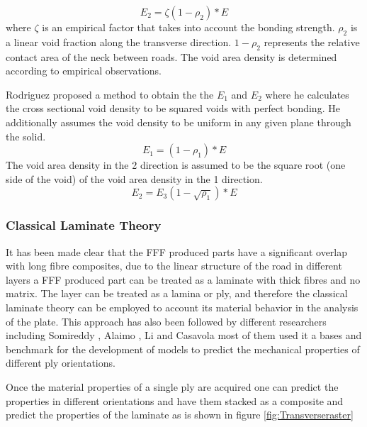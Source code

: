 \begin{equation} \label{eqn:ROMseriesfactor}
E_2=\zeta(1-\rho_2)*E
\end{equation}
where $\zeta$ is an empirical factor that takes into account the bonding strength. $\rho_2$ is a linear void fraction along the transverse direction. $1-\rho_2$  represents the relative contact area of the neck between roads. The void area density is determined according to empirical observations. 

Rodriguez \cite{Rodriguez2003MechanicalModeling} proposed a method to obtain the the $E_1$ and $E_2$ where he calculates the cross sectional void density to be squared voids with perfect bonding. He additionally assumes the void density to be uniform in any given plane through the solid. 
\begin{equation}\label{eqn:E_1}
E_1=(1-\rho_1)*E
\end{equation}The void area density in the 2 direction is assumed to be the square root (one side of the void) of the void area density in the 1 direction.
\begin{equation}\label{eqn:E_2}
E_2=E_3(1-\sqrt{\rho_1})*E
\end{equation}
\subsubsection{Classical Laminate Theory}
It has been made clear that the FFF produced parts have a significant overlap with long fibre composites, due to the linear structure of the road in different layers a FFF produced part can be treated as a laminate with thick fibres and no matrix. The layer can be treated as a lamina or ply, and therefore the classical laminate theory can be employed to account its material behavior in the analysis of the plate. This approach has also been followed by different researchers including Somireddy \cite{Somireddy2018DevelopmentFDM}\cite{Somireddy2017FlexuralStudy}\cite{Somireddy2017MechanicalMesostructure}, Alaimo \cite{Alaimo2017InfluenceParts}, Li \cite{Li2002CompositeProperties} and Casavola \cite{Casavola2016OrthotropicTheory} most of them used it a bases and benchmark for the development of  models to predict the mechanical properties of different ply orientations.

Once the material properties of a single ply are acquired one can predict the properties in different orientations and have them stacked as a composite and predict the properties of the laminate as is shown in figure \ref{fig:Transverseraster}

